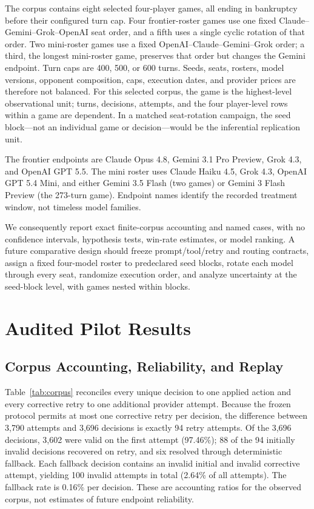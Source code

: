 \documentclass[conference]{IEEEtran}
\begin{document}
The corpus contains eight selected four-player games, all ending in bankruptcy
before their configured turn cap. Four frontier-roster games use one fixed
Claude--Gemini--Grok--OpenAI seat order, and a fifth uses a single cyclic
rotation of that order. Two mini-roster games use a fixed
OpenAI--Claude--Gemini--Grok order; a third, the longest mini-roster game,
preserves that order but changes the Gemini endpoint. Turn caps are 400, 500,
or 600 turns. Seeds, seats, rosters, model versions, opponent composition,
caps, execution dates, and provider prices are therefore not balanced. For
this selected corpus, the game is the highest-level observational unit;
turns, decisions, attempts, and the four player-level rows within a game are
dependent. In a matched seat-rotation campaign, the seed block---not an
individual game or decision---would be the inferential replication unit.

The frontier endpoints are Claude Opus 4.8, Gemini 3.1 Pro Preview, Grok 4.3,
and OpenAI GPT 5.5. The mini roster uses Claude Haiku 4.5, Grok 4.3, OpenAI
GPT 5.4 Mini, and either Gemini 3.5 Flash (two games) or Gemini 3 Flash Preview
(the 273-turn game). Endpoint names identify the recorded treatment window,
not timeless model families.

We consequently report exact finite-corpus accounting and named cases, with
no confidence intervals, hypothesis tests, win-rate estimates, or model
ranking. A future comparative design should freeze prompt/tool/retry and
routing contracts, assign a fixed four-model roster to predeclared seed
blocks, rotate each model through every seat, randomize execution order, and
analyze uncertainty at the seed-block level, with games nested within blocks.

\section{Audited Pilot Results}
\label{sec:results}

\subsection{Corpus Accounting, Reliability, and Replay}

Table~\ref{tab:corpus} reconciles every unique decision to one applied action
and every corrective retry to one additional provider attempt. Because the
frozen protocol permits at most one corrective retry per decision, the
difference between 3,790 attempts and 3,696 decisions is exactly 94 retry
attempts. Of the 3,696 decisions, 3,602 were valid on the first attempt
(97.46\%); 88 of the 94 initially invalid decisions recovered on retry, and
six resolved through deterministic fallback. Each fallback decision contains
an invalid initial and invalid corrective attempt, yielding 100 invalid
attempts in total (2.64\% of all attempts). The fallback rate is 0.16\% per
decision. These are accounting ratios for the observed corpus, not estimates
of future endpoint reliability.
\end{document}
